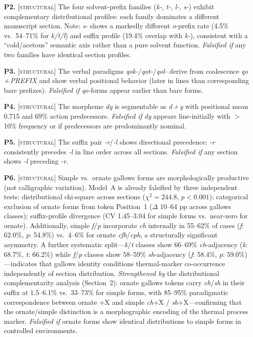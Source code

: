 \documentclass[11pt,a4paper]{article}
\newcommand{\structural}{\textsc{[structural]}}
\newcommand{\falsmark}{\textit{Falsified if}}
\begin{document}
\medskip

\noindent\textbf{P2.} \structural{} The four solvent-prefix families (\textit{k-}, \textit{t-}, \textit{l-}, \textit{s-}) exhibit complementary distributional profiles: each family dominates a different manuscript section. Note: \textit{s-} shows a markedly different \textit{o}-prefix rate (4.5\% vs.\ 54--71\% for \textit{k/t/l}) and suffix profile (19.4\% overlap with \textit{k-}), consistent with a ``cold/acetous'' semantic axis rather than a pure solvent function. \falsmark{} any two families have identical section profiles.

\medskip

\noindent\textbf{P3.} \structural{} The verbal paradigms \textit{qok-}/\textit{qot-}/\textit{qol-} derive from coalescence \textit{qo\,+\,PREFIX} and show verbal positional behavior (later in lines than corresponding bare prefixes). \falsmark{} \textit{qo-}forms appear earlier than bare forms.

\medskip

\noindent\textbf{P4.} \structural{} The morpheme \textit{dy} is segmentable as \textit{d\,+\,y} with positional mean 0.715 and 69\% action predecessors. \falsmark{} \textit{dy} appears line-initially with $>$\,10\% frequency or if predecessors are predominantly nominal.

\medskip

\noindent\textbf{P5.} \structural{} The suffix pair \textit{-r}/\textit{-l} shows directional precedence: \textit{-r} consistently precedes \textit{-l} in line order across all sections. \falsmark{} any section shows \textit{-l} preceding \textit{-r}.

\medskip

\noindent\textbf{P6.} \structural{} Simple vs.\ ornate gallows forms are morphologically productive (not calligraphic variation). Model~A is already falsified by three independent tests: distributional chi-square across sections ($\chi^2 = 244.8$, $p < 0.001$); categorical exclusion of ornate forms from token Position~1 ($\Delta$ 10--64 pp across gallows classes); suffix-profile divergence (CV 1.45--3.04 for simple forms vs.\ near-zero for ornate). Additionally, simple \textit{f}/\textit{p} incorporate \textit{ch} internally in 55--62\% of cases (\textit{f}: 62.0\%, \textit{p}: 54.8\%) vs.\ 4--6\% for ornate \textit{cfh}/\textit{cph}, a structurally significant asymmetry. A further systematic split---\textit{k}/\textit{t} classes show 66--69\% \textit{ch}-adjacency (\textit{k}: 68.7\%, \textit{t}: 66.2\%) while \textit{f}/\textit{p} classes show 58--59\% \textit{sh}-adjacency (\textit{f}: 58.4\%, \textit{p}: 59.0\%)---indicates that gallows identity conditions thermal-marker co-occurrence independently of section distribution. \textit{Strengthened by} the distributional complementarity analysis (Section~2): ornate gallows tokens carry \textit{ch}/\textit{sh} in their suffix at 1.5--6.1\% vs.\ 33--73\% for simple forms, with 85--95\% paradigmatic correspondence between ornate +X and simple \textit{ch}+X / \textit{sh}+X---confirming that the ornate/simple distinction is a morphographic encoding of the thermal process marker. \falsmark{} ornate forms show identical distributions to simple forms in controlled environments.
\end{document}
